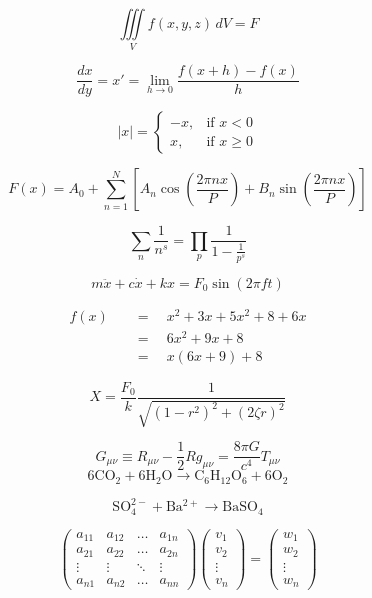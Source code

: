 \documentclass{article}
\begin{document}
\thispagestyle{empty}
\begin{equation*}
\iiint\limits_V f(x,y,z)\,dV = F
\end{equation*}

\begin{equation*}
\frac{dx}{dy}=x'=\lim_{h \to 0}\frac{f(x+h)-f(x)}{h}
\end{equation*}

\begin{equation*}
|x|=\begin{cases}
-x, & \text{if $x < 0$}\\
x, & \text{if $x \geq 0$} 
\end{cases}
\end{equation*}

\begin{equation*}
F(x)= A_0 + \sum_{n=1}^N\left[ A_n\cos{\left(\frac{2\pi nx}{P}\right)}+B_n\sin{\left(\frac{2\pi nx}{P}\right)}\right]
\end{equation*}

\begin{equation*}
\sum_n \frac{1}{n^s}=\prod_p \frac{1}{1-\frac{1}{p^s}}
\end{equation*}

\begin{equation*}
m\ddot{x}+c\dot{x}+kx=F_0\sin(2\pi ft)
\end{equation*}

\begin{align*}
f(x)\quad &=\quad x^2 + 3x + 5x^2 +8 +6x\\
&=\quad 6x^2 +9x +8\\
&=\quad x(6x+9)+8
\end{align*}

\[
X=\frac{F_0}{k}\frac{1}{\sqrt{(1-r^2)^2+(2\zeta r)^2}}
\]

\begin{equation*}
G_{\mu\nu} \equiv R_{\mu\nu}-\frac{1}{2}Rg_{\mu\nu}=\frac{8\pi G}{c^4}T_{\mu\nu}
\end{equation*}
\[
\mathrm{6CO_2+6H_2O \to C_6H_{12}O_6+6O_2}
\]

\[
\mathrm{SO_4^{2-}+Ba^{2+} \to BaSO_4 }
\]

\begin{equation*}
\begin{pmatrix}
a_{11}&a_{12}&\dots&a_{1n}\\
a_{21}&a_{22}&\dots&a_{2n}\\
\vdots&\vdots&\ddots&\vdots\\
a_{n1}&a_{n2}&\dots&a_{nn}
\end{pmatrix}
\begin{pmatrix}
v_{1}\\
v_{2}\\
\vdots\\
v_{n}
\end{pmatrix}
=
\begin{pmatrix}
w_{1}\\
w_{2}\\
\vdots\\
w_{n}
\end{pmatrix}
\end{equation*}
\end{document}
